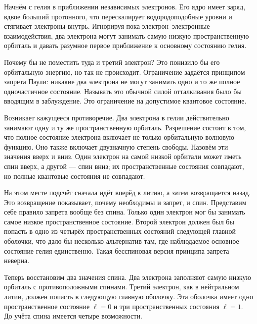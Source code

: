 Начнём с гелия в приближении независимых электронов. Его ядро имеет заряд, вдвое больший протонного, что перескалирует водородоподобные уровни и стягивает электроны внутрь. Игнорируя пока электрон--электронные взаимодействия, два электрона могут занимать самую низкую пространственную орбиталь и давать разумное первое приближение к основному состоянию гелия.

Почему бы не поместить туда и третий электрон? Это понизило бы его орбитальную энергию, но так не происходит. Ограничение задаётся принципом запрета Паули: никакие два электрона не могут занимать одно и то же полное одночастичное состояние. Называть это обычной силой отталкивания было бы вводящим в заблуждение. Это ограничение на допустимое квантовое состояние.

Возникает кажущееся противоречие. Два электрона в гелии действительно занимают одну и ту же пространственную орбиталь. Разрешение состоит в том, что полное состояние электрона включает не только орбитальную волновую функцию. Оно также включает двузначную степень свободы. Назовём эти значения вверх и вниз. Один электрон на самой низкой орбитали может иметь спин вверх, а другой — спин вниз; их пространственные состояния совпадают, но полные квантовые состояния не совпадают.

На этом месте подсчёт сначала идёт вперёд к литию, а затем возвращается назад. Это возвращение показывает, почему необходимы и запрет, и спин. Представим себе правило запрета вообще без спина. Только один электрон мог бы занимать самое низкое пространственное состояние. Второй электрон должен был бы попасть в одно из четырёх пространственных состояний следующей главной оболочки, что дало бы несколько альтернатив там, где наблюдаемое основное состояние гелия единственно. Такая бесспиновая версия принципа запрета неверна.

Теперь восстановим два значения спина. Два электрона заполняют самую низкую орбиталь с противоположными спинами. Третий электрон, как в нейтральном литии, должен попасть в следующую главную оболочку. Эта оболочка имеет одно пространственное состояние \(\ell=0\) и три пространственных состояния \(\ell=1\). До учёта спина имеется четыре возможности.

\begin{classroomqa}
\end{classroomqa}

